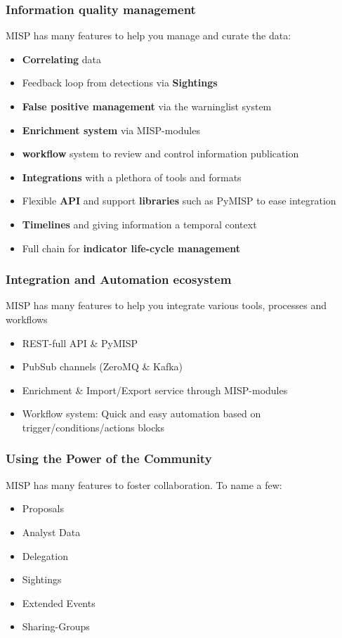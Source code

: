 \begin{frame}
    \frametitle{Information quality management}
    MISP has many features to help you manage and curate the data:
    \begin{itemize}
        \item \textbf{Correlating} data
        \item Feedback loop from detections via {\bf Sightings}
        \item {\bf False positive management} via the warninglist system
        \item {\bf Enrichment system} via MISP-modules
        \item {\bf workflow} system to review and control information publication
        \item {\bf Integrations} with a plethora of tools and formats
        \item Flexible {\bf API} and support {\bf libraries} such as PyMISP to ease integration
        \item {\bf Timelines} and giving information a temporal context
        \item Full chain for {\bf indicator life-cycle management}
    \end{itemize}
\end{frame}

\begin{frame}
    \frametitle{Integration and Automation ecosystem}
    MISP has many features to help you integrate various tools, processes and workflows
    \begin{itemize}
        \item REST-full API \& PyMISP
        \item PubSub channels (ZeroMQ \& Kafka)
        \item Enrichment \& Import/Export service through MISP-modules
        \item Workflow system: Quick and easy automation based on trigger/conditions/actions blocks
    \end{itemize}
\end{frame}

\begin{frame}
    \frametitle{Using the Power of the Community}
    MISP has many features to foster collaboration. To name a few:
    \begin{itemize}
        \item Proposals
        \item Analyst Data
        \item Delegation
        \item Sightings
        \item Extended Events
        \item Sharing-Groups
    \end{itemize}
\end{frame}

